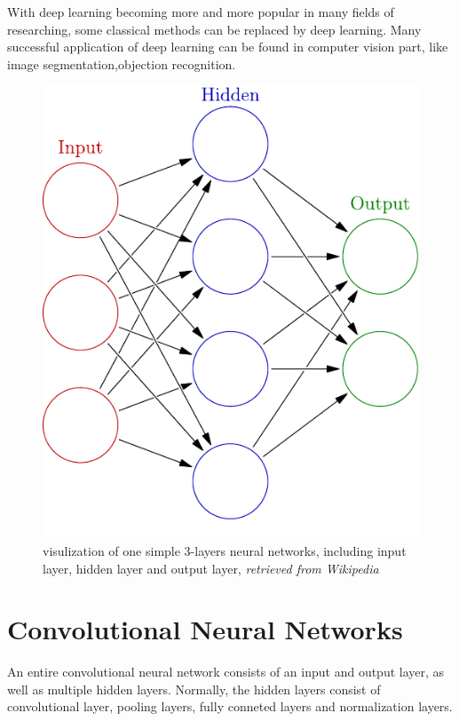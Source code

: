     With deep learning becoming more and more popular in many fields of researching, some classical methods can be replaced by deep learning. Many successful application of deep learning can be found in computer vision part, like image segmentation\cite{lecun2015deep},objection recognition\cite{he2016deep}.
     \begin{figure}[!ht]
        \centering
        \includegraphics[scale = 0.5]{Figures/Colored_neural_network}
        \caption{visulization of one simple $3$-layers neural networks, including input layer, hidden layer and output layer, \textit{retrieved from Wikipedia}}
    \end{figure}

\section{Convolutional Neural Networks}
    \label{cnn}
    An entire convolutional neural network consists of an input and output layer, as well as multiple hidden layers. Normally, the hidden layers consist of convolutional layer, pooling layers, fully conneted layers and normalization layers. \\

